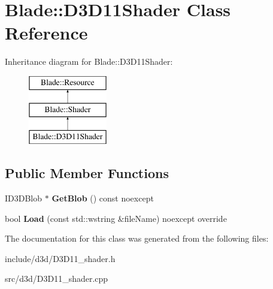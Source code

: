 \hypertarget{class_blade_1_1_d3_d11_shader}{}\section{Blade\+:\+:D3\+D11\+Shader Class Reference}
\label{class_blade_1_1_d3_d11_shader}
Inheritance diagram for Blade\+:\+:D3\+D11\+Shader\+:\begin{figure}[H]
\begin{center}
\leavevmode
\includegraphics[height=3.000000cm]{class_blade_1_1_d3_d11_shader}
\end{center}
\end{figure}
\subsection*{Public Member Functions}
\begin{DoxyCompactItemize}
\item 
\mbox{\label{class_blade_1_1_d3_d11_shader_a3e46be884a59d7bf6ac3142e4f8c8626}} 
I\+D3\+D\+Blob $\ast$ {\bfseries Get\+Blob} () const noexcept
\item 
\mbox{\label{class_blade_1_1_d3_d11_shader_a713231594415a37d484f115478acf084}} 
bool {\bfseries Load} (const std\+::wstring \&file\+Name) noexcept override
\end{DoxyCompactItemize}


The documentation for this class was generated from the following files\+:\begin{DoxyCompactItemize}
\item 
include/d3d/D3\+D11\+\_\+shader.\+h\item 
src/d3d/D3\+D11\+\_\+shader.\+cpp\end{DoxyCompactItemize}
